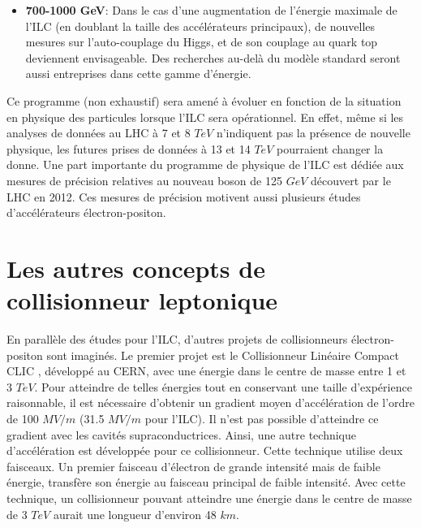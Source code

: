 \begin{itemize}
\item \textbf{700-1000 GeV}: Dans le cas d'une augmentation de l'énergie maximale de l'ILC (en doublant la taille des accélérateurs principaux), de nouvelles mesures sur l'auto-couplage du Higgs, et de son couplage au quark top deviennent envisageable. Des recherches au-delà du modèle standard seront aussi entreprises dans cette gamme d'énergie. 
\end{itemize}

Ce programme (non exhaustif) sera amené à évoluer en fonction de la situation en physique des particules lorsque l'ILC sera opérationnel. En effet, même si les analyses de données au LHC à 7 et 8 $TeV$ n'indiquent pas la présence de nouvelle physique, les futures prises de données à 13 et 14 $TeV$ pourraient changer la donne. Une part importante du programme de physique de l'ILC est dédiée aux mesures de précision relatives au nouveau boson de 125 $GeV$ découvert par le LHC en 2012. Ces mesures de précision motivent aussi plusieurs études d'accélérateurs électron-positon. 
\section{Les autres concepts de collisionneur leptonique}
\label{sec.clic}
En parallèle des études pour l'ILC, d'autres projets de collisionneurs électron-positon sont imaginés. Le premier projet est le Collisionneur Linéaire Compact CLIC \cite{clicAcc}, développé au CERN, avec une énergie dans le centre de masse entre 1 et 3 $TeV$. Pour atteindre de telles énergies tout en conservant une taille d'expérience raisonnable, il est nécessaire d’obtenir un gradient moyen d'accélération de l'ordre de 100 $MV/m$ (31.5 $MV/m$ pour l'ILC). Il n'est pas possible d'atteindre ce gradient avec les cavités supraconductrices. Ainsi, une autre technique d'accélération est développée pour ce collisionneur. Cette technique utilise deux faisceaux. Un premier faisceau d'électron de grande intensité mais de faible énergie, transfère son énergie au faisceau principal de faible intensité. Avec cette technique, un collisionneur pouvant atteindre une énergie dans le centre de masse de 3 $TeV$ aurait une longueur d'environ 48 $km$. 

